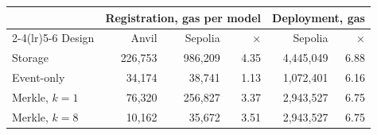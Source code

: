 \begin{tabular}{lrrrrr}
\toprule
 & \multicolumn{3}{c}{Registration, gas per model} & \multicolumn{2}{c}{Deployment, gas} \\
\cmidrule(lr){2-4}\cmidrule(lr){5-6}
Design & Anvil & Sepolia & $\times$ & Sepolia & $\times$ \\
\midrule
Storage & 226{,}753 & 986{,}209 & 4.35 & 4{,}445{,}049 & 6.88 \\
Event-only & 34{,}174 & 38{,}741 & 1.13 & 1{,}072{,}401 & 6.16 \\
Merkle, $k=1$ & 76{,}320 & 256{,}827 & 3.37 & 2{,}943{,}527 & 6.75 \\
Merkle, $k=8$ & 10{,}162 & 35{,}672 & 3.51 & 2{,}943{,}527 & 6.75 \\
\bottomrule
\end{tabular}
